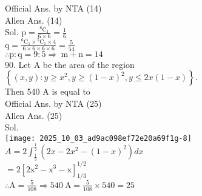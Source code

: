 \documentclass[10pt]{article}
\begin{document}
Official Ans. by NTA (14)\\
Allen Ans. (14)\\
Sol. \(\mathrm{p}=\frac{{ }^{6} \mathrm{C}_{1}}{6 \times 6}=\frac{1}{6}\)\\
\(\mathrm{q}=\frac{{ }^{6} \mathrm{C}_{1} \times{ }^{5} \mathrm{C}_{1} \times 4}{6 \times 6 \times 6 \times 6}=\frac{5}{54}\)\\
\(\therefore \mathrm{p}: \mathrm{q}=9: 5 \Rightarrow \mathrm{~m}+\mathrm{n}=14\)\\
90. Let A be the area of the region\\
\(\left\{(x, y): y \geq x^{2}, y \geq(1-x)^{2}, y \leq 2 x(1-x)\right\}\).\\
Then 540 A is equal to\\
Official Ans. by NTA (25)\\
Allen Ans. (25)\\
Sol.\\
\texttt{[image: 2025\_10\_03\_ad9ac098ef72e20a69f1g-8]}\\
\(A=2 \int_{\frac{1}{3}}^{\frac{1}{2}}\left(2 x-2 x^{2}-(1-x)^{2}\right) d x\)\\
\(=2\left[2 \mathrm{x}^{2}-\mathrm{x}^{3}-\mathrm{x}\right]_{1 / 3}^{1 / 2}\)\\
\(\therefore \mathrm{A}=\frac{5}{108} \Rightarrow 540 \mathrm{~A}=\frac{5}{108} \times 540=25\)
\end{document}
